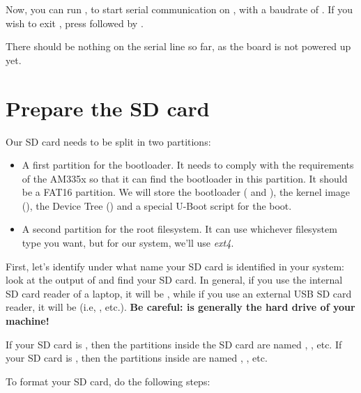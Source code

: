 Now, you can run , to start
serial communication on , with a baudrate of
. If you wish to exit , press
\code{[Ctrl][a]} followed by \code{[Ctrl][x]}.

There should be nothing on the serial line so far, as the board is not
powered up yet.

\section{Prepare the SD card}

Our SD card needs to be split in two partitions:

\begin{itemize}

\item A first partition for the bootloader. It needs to comply with
  the requirements of the AM335x so that it can find the bootloader in
  this partition. It should be a FAT16 partition. We will store the
  bootloader ( and ), the kernel image
  (), the Device Tree () and a
  special U-Boot script for the boot.

\item A second partition for the root filesystem. It can use
  whichever filesystem type you want, but for our system, we'll use
  {\em ext4}.

\end{itemize}

First, let's identify under what name your SD card is identified in
your system: look at the output of  and
find your SD card. In general, if you use the internal SD card reader
of a laptop, it will be , while if you use an external
USB SD card reader, it will be  (i.e, ,
etc.). {\bf Be careful:  is generally the hard drive of
  your machine!}

If your SD card is , then the partitions inside the
SD card are named , , etc. If your SD
card is , then the partitions inside are named
, , etc.

To format your SD card, do the following steps:

